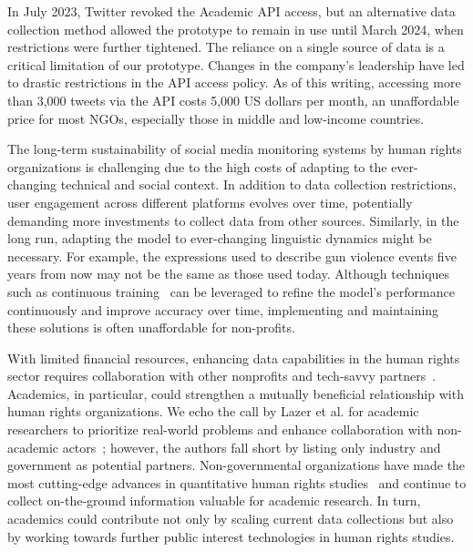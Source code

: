\documentclass[11pt,letterpaper]{article}
\begin{document}
In July 2023, Twitter revoked the Academic API access, but an alternative data collection method allowed the prototype to remain in use until March 2024, when restrictions were further tightened. The reliance on a single source of data is a critical limitation of our prototype. Changes in the company’s leadership have led to drastic restrictions in the API access policy. As of this writing, accessing more than 3,000 tweets via the API costs 5,000 US dollars per month, an unaffordable price for most NGOs, especially those in middle and low-income countries.

The long-term sustainability of social media monitoring systems by human rights organizations is challenging due to the high costs of adapting to the ever-changing technical and social context. In addition to data collection restrictions, user engagement across different platforms evolves over time, potentially demanding more investments to collect data from other sources. Similarly, in the long run, adapting the model to ever-changing linguistic dynamics might be necessary. For example, the expressions used to describe gun violence events five years from now may not be the same as those used today. Although techniques such as continuous training~\citep{baylorContinuousTrainingProduction2019} can be leveraged to refine the model’s performance continuously and improve accuracy over time, implementing and maintaining these solutions is often unaffordable for non-profits.

With limited financial resources, enhancing data capabilities in the human rights sector requires collaboration with other nonprofits and tech-savvy partners~\citep{farmerDataSocialGood2023}. Academics, in particular, could strengthen a mutually beneficial relationship with human rights organizations. We echo the call by Lazer et al. for academic researchers to prioritize real-world problems and enhance collaboration with non-academic actors~\citep{lazerComputationalSocialScience2020}; however, the authors fall short by listing only industry and government as potential partners. Non-governmental organizations have made the most cutting-edge advances in quantitative human rights studies~\citep{unitednationsHumanRightsIndicators2013,goodhartHumanRightsPolitics2016} and continue to collect on-the-ground information valuable for academic research. In turn, academics could contribute not only by scaling current data collections but also by working towards further public interest technologies in human rights studies.
\end{document}
